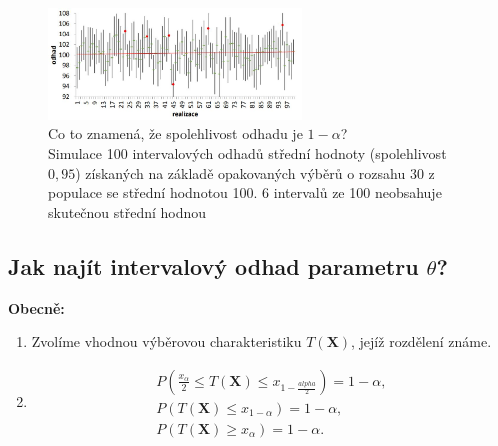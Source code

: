 \begin{figure}[H]
\centering
\includegraphics[width=0.6\textwidth]{assets/14_spolehlivost_odhadu}
\caption{Co to znamená, že spolehlivost odhadu je $1- \alpha$? \\Simulace 100 intervalových odhadů střední hodnoty (spolehlivost $0,95$) získaných na základě opakovaných výběrů o rozsahu 30 z populace se střední hodnotou 100. 6 intervalů ze 100 neobsahuje skutečnou střední hodnou}
\end{figure}
\subsection{Jak najít intervalový odhad parametru $\theta$?}
\textbf{Obecně:}
\begin{enumerate}
	\item Zvolíme vhodnou výběrovou charakteristiku $T(\mathbf{X})$, jejíž rozdělení známe.
	\item \begin{equation*}
			\begin{split}
				P(\frac{x_\alpha}{2} \leq T(\mathbf{X}) \leq x_{1 - \frac{alpha}{2}}) = 1 - \alpha, \\
				P(T(\mathbf{X}) \leq x_{1-\alpha}) = 1 - \alpha, \\
				P(T(\mathbf{X}) \geq x_\alpha) = 1 - \alpha.	
			\end{split}
		\end{equation*}
\end{enumerate}

